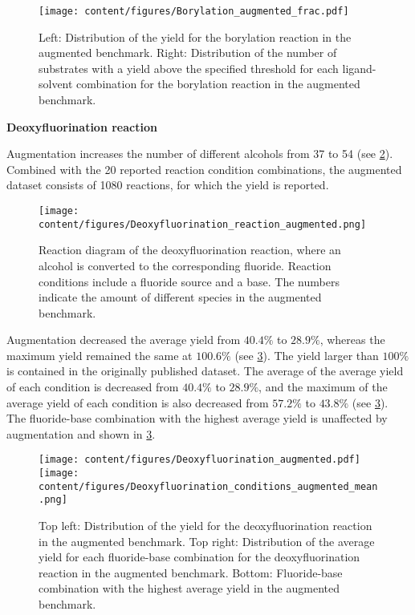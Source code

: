 \begin{figure}[h]
    \centering
    \texttt{[image: content/figures/Borylation\_augmented\_frac.pdf]}
    \caption{Left: Distribution of the yield for the borylation reaction in the augmented benchmark. Right: Distribution of the number of substrates with a yield above the specified threshold for each ligand-solvent combination for the borylation reaction in the augmented benchmark.}
    \label{fig:Borylation_EDA_frac_augmented}
\end{figure}
\newpage
\textbf{Deoxyfluorination reaction}

Augmentation increases the number of different alcohols from 37 to 54 (see \cref{fig:Deoxyfluorination_reaction_augmented}). Combined with the 20 reported reaction condition combinations, the augmented dataset consists of 1080 reactions, for which the yield is reported.

\begin{figure}[h]
    \centering
    \texttt{[image: content/figures/Deoxyfluorination\_reaction\_augmented.png]}
    \caption{Reaction diagram of the deoxyfluorination reaction, where an alcohol is converted to the corresponding fluoride. Reaction conditions include a fluoride source and a base. The numbers indicate the amount of different species in the augmented benchmark.}
    \label{fig:Deoxyfluorination_reaction_augmented}
\end{figure}

Augmentation decreased the average yield from $40.4\%$ to $28.9\%$, whereas the maximum yield remained the same at $100.6\%$ (see \cref{fig:Deoxyfluorination_EDA_augmented}).
The yield larger than $100\%$ is contained in the originally published dataset.
The average of the average yield of each condition is decreased from $40.4\%$ to $28.9\%$, and the maximum of the average yield of each condition is also decreased from $57.2\%$ to $43.8\%$ (see \cref{fig:Deoxyfluorination_EDA_augmented}).
The fluoride-base combination with the highest average yield is unaffected by augmentation and shown in \cref{fig:Deoxyfluorination_EDA_augmented}.

\begin{figure}[h]
    \centering
    \texttt{[image: content/figures/Deoxyfluorination\_augmented.pdf]}
    \texttt{[image: content/figures/Deoxyfluorination\_conditions\_augmented\_mean.png]}
    \caption{Top left: Distribution of the yield for the deoxyfluorination reaction in the augmented benchmark. Top right: Distribution of the average yield for each fluoride-base combination for the deoxyfluorination reaction in the augmented benchmark. Bottom: Fluoride-base combination with the highest average yield in the augmented benchmark.}
    \label{fig:Deoxyfluorination_EDA_augmented}
\end{figure}

